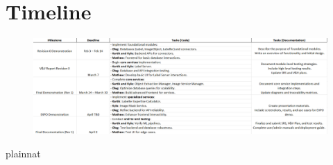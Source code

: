 \documentclass[12pt, titlepage]{article}
\begin{document}
\section{Timeline}

\begin{figure}[H]
  \centering
  \includegraphics[width=1\textwidth]{timeline.png}
  \label{FigUH}
\end{figure}

 {plainnat}


\newpage{}

\end{document}
